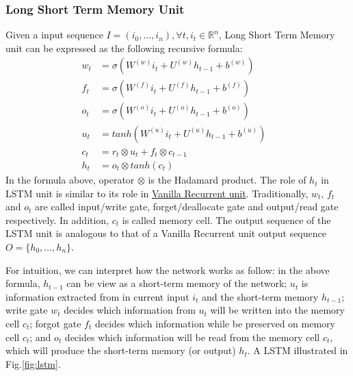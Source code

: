 \subsubsection{Long Short Term Memory Unit}\label{sec:lstm}
Given a input sequence \(I = (i_0,\ldots,i_n), \forall t, i_t \in \mathbb{R}^n\), Long Short Term Memory unit can be expressed as the following recursive formula\cite{treeLSTM}:
\begin{align}
	w_t &= \sigma(W^{(w)}i_t + U^{(w)}h_{t-1} + b^{(w)}) \label{eq:lstm-input-gate}&\\ 
  	f_t &= \sigma(W^{(f)}i_t + U^{(f)}h_{t-1} + b^{(f)}) \label{eq:lstm-forget-gate}&\\ 
  	o_t &= \sigma(W^{(o)}i_t + U^{(o)}h_{t-1} + b^{(o)}) \label{eq:lstm-output-gate}&\\ 
  	u_t &= tanh(W^{(u)}i_t + U^{(u)}h_{t-1} + b^{(u)}) \label{eq:lstm-update-gate}&\\ 
  	c_t &= r_t \otimes u_t + f_t \otimes c_{t-1} \label{eq:longterm-mem}&\\ 
  	h_t &= o_t \otimes tanh(c_t) \label{eq:temperal-mem}& 
\end{align}
In the formula above, operator \(\otimes\) is the Hadamard product\cite{element-prod}.
The role of \(h_t\) in LSTM unit is similar to its role in \hyperref[sec:vanilla-rnn]{Vanilla Recurrent unit}. 
Traditionally, \(w_t\), \(f_t\) and \(o_t\) are called input/write gate, forget/deallocate gate and output/read gate respectively. 
In addition, \(c_t\) is called memory cell. 
The output sequence of the LSTM unit is analogous to that of a Vanilla Recurrent unit output sequence \(O = \{h_0,\ldots,h_n\}\).

For intuition, we can interpret how the network works as follow: in the above formula, \(h_{t-1}\) can be view as a short-term memory of the network; \(u_t\) is information extracted from in current input \(i_t\) and the short-term memory \(h_{t-1}\); write gate \(w_t\) decides which information from \(u_t\) will be written into the memory cell \(c_t\); forgot gate \(f_t\) decides which information while be preserved on memory cell \(c_t\); and \(o_t\) decides which information will be read from the memory cell \(c_t\), which will produce the short-term memory (or output) \(h_t\). 
A LSTM illustrated in Fig.\ref{fig:lstm}.

